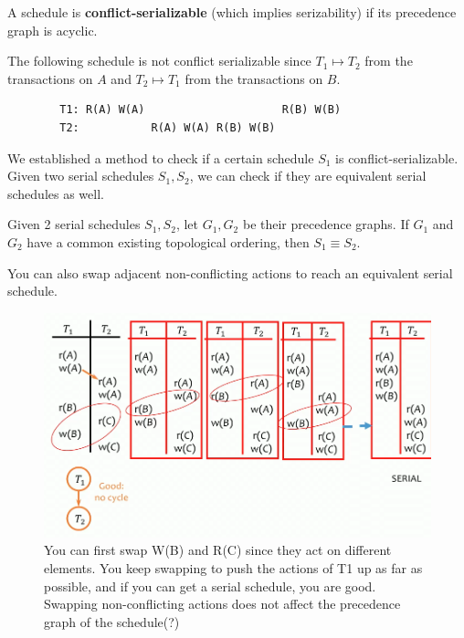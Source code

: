 \documentclass{article}
\begin{document}
    \begin{theorem}
      A schedule is \textbf{conflict-serializable} (which implies serizability) if its precedence graph is acyclic. 
    \end{theorem} 

    \begin{example}
      The following schedule is not conflict serializable since $T_1 \mapsto T_2$ from the transactions on $A$ and $T_2 \mapsto T_1$ from the transactions on $B$. 
      \begin{lstlisting}
        T1: R(A) W(A)                     R(B) W(B)
        T2:           R(A) W(A) R(B) W(B) 
      \end{lstlisting}
    \end{example}

    We established a method to check if a certain schedule $S_1$ is conflict-serializable. Given two serial schedules $S_1, S_2$, we can check if they are equivalent serial schedules as well. 

    \begin{theorem}
      Given 2 serial schedules $S_1, S_2$, let $G_1, G_2$ be their precedence graphs. If $G_1$ and $G_2$ have a common existing topological ordering, then $S_1 \equiv S_2$. 
    \end{theorem} 

    \begin{theorem}
      You can also swap adjacent non-conflicting actions to reach an equivalent serial schedule. 

      \begin{figure}[H]
        \centering 
        \includegraphics[scale=0.4]{img/swap_serial.png}
        \caption{You can first swap W(B) and R(C) since they act on different elements. You keep swapping to push the actions of T1 up as far as possible, and if you can get a serial schedule, you are good. Swapping non-conflicting actions does not affect the precedence graph of the schedule(?)} 
        \label{fig:swap_serial}
      \end{figure}
    \end{theorem} 
\end{document}
